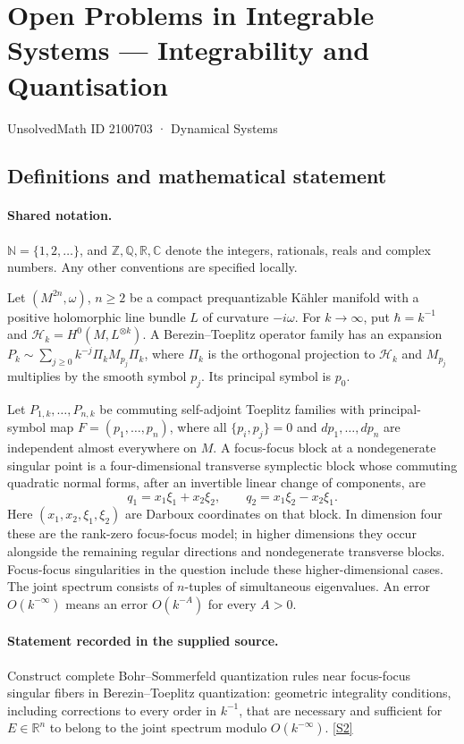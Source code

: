 \documentclass[11pt]{article}
\newcommand{\sref}[2]{\hyperlink{source:#1:#2}{[S#2]}}
\begin{document}
\setcounter{section}{2100702}
\section{Open Problems in Integrable Systems — Integrability and Quantisation}\label{2100703}
{\small\sffamily UnsolvedMath ID 2100703 · Dynamical Systems}
\subsection{Definitions and mathematical statement}

\paragraph{Shared notation.}$\mathbb N=\{1,2,\ldots\}$, and $\mathbb Z,\mathbb Q,\mathbb R,\mathbb C$ denote the integers, rationals, reals and complex numbers. Any other conventions are specified locally.


Let $(M^{2n},\omega)$, $n\geq2$ be a compact prequantizable Kähler manifold with a positive holomorphic line bundle $L$ of curvature $-i\omega$. For $k\to\infty$, put $\hbar=k^{-1}$ and $\mathcal H_k=H^0(M,L^{\otimes k})$. A Berezin--Toeplitz operator family has an expansion $P_k\sim\sum_{j\geq0}k^{-j}\Pi_k M_{p_j}\Pi_k$, where $\Pi_k$ is the orthogonal projection to $\mathcal H_k$ and $M_{p_j}$ multiplies by the smooth symbol $p_j$. Its principal symbol is $p_0$.\par Let $P_{1,k},\ldots,P_{n,k}$ be commuting self-adjoint Toeplitz families with principal-symbol map $F=(p_1,\ldots,p_n)$, where all $\{p_i,p_j\}=0$ and $dp_1,\ldots,dp_n$ are independent almost everywhere on $M$. A focus-focus block at a nondegenerate singular point is a four-dimensional transverse symplectic block whose commuting quadratic normal forms, after an invertible linear change of components, are
\[q_1=x_1\xi_1+x_2\xi_2,\qquad q_2=x_1\xi_2-x_2\xi_1.\]
Here $(x_1,x_2,\xi_1,\xi_2)$ are Darboux coordinates on that block. In dimension four these are the rank-zero focus-focus model; in higher dimensions they occur alongside the remaining regular directions and nondegenerate transverse blocks. Focus-focus singularities in the question include these higher-dimensional cases. The joint spectrum consists of $n$-tuples of simultaneous eigenvalues. An error $O(k^{-\infty})$ means an error $O(k^{-A})$ for every $A>0$.
\paragraph{Statement recorded in the supplied source.}
Construct complete Bohr--Sommerfeld quantization rules near focus-focus singular fibers in Berezin--Toeplitz quantization: geometric integrality conditions, including corrections to every order in $k^{-1}$, that are necessary and sufficient for $E\in\mathbb R^n$ to belong to the joint spectrum modulo $O(k^{-\infty})$. \sref{2100703}{2}
\end{document}
